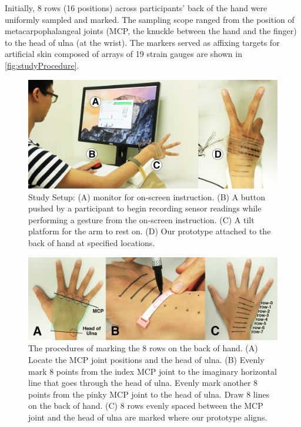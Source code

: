 \documentclass{sigchi}
\begin{document}
Initially, 8 rows (16 positions) across participants’ back of the hand were uniformly sampled and marked. The sampling scope ranged from the position of metacarpophalangeal joints (MCP, the knuckle between the hand and the finger) to the head of ulna (at the wrist).%
 The markers served as affixing targets for artificial skin composed of arrays of 19 strain gauges are shown in \autoref{fig:studyProcedure}.

\begin{figure}[t]
  \includegraphics[width=1\columnwidth]{figures/StudyEnv.jpg}
  \caption{Study Setup:
            (A) monitor for on-screen instruction.
            (B) A button pushed by a participant to begin recording sensor readings while performing a gesture from the on-screen instruction.
            (C) A tilt platform for the arm to rest on.
            (D) Our prototype attached to the back of hand at specified locations. }
  \label{fig:StudyEnv}
\end{figure}

\begin{figure}
  \begin{center}
  \includegraphics[width=1\columnwidth]{figures/studyProcedure.jpg}
  \caption{The procedures of marking the 8 rows on the back of hand.
          (A) Locate the MCP joint positions and the head of ulna. 
          (B) Evenly mark 8 points from the index MCP joint to the imaginary horizontal line that goes through the head of ulna. Evenly mark another 8 points from the pinky MCP joint to the head of ulna. Draw 8 lines on the back of hand.
          (C) 8 rows evenly spaced between the MCP joint and the head of ulna are marked where our prototype aligns.
  }
  \label{fig:studyProcedure}
  \end{center}
\end{figure}
\end{document}
